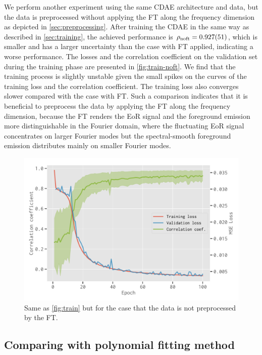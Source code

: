 \documentclass[letters,a4paper,fleqn,usenatbib]{mnras}
\newcommand{\R}[1]{\mathrm{#1}}
\begin{document}
We perform another experiment using the same CDAE architecture and data,
but the data is preprocessed without applying the FT along the
frequency dimension as depicted in \autoref{sec:preprocessing}.
After training the CDAE in the same way as described in
\autoref{sec:training}, the achieved performance is
$\rho_{\R{noft}} = \num{0.927 +- 0.051}$, which is smaller and has a
larger uncertainty than the case with FT applied, indicating a worse
performance.
The losses and the correlation coefficient on the validation set
during the training phase are presented in \autoref{fig:train-noft}.
We find that the training process is slightly unstable given the small
spikes on the curves of the training loss and the correlation
coefficient.
The training loss also converges slower compared with the case with FT.
Such a comparison indicates that it is beneficial to preprocess the
data by applying the FT along the frequency dimension, because the FT
renders the EoR signal and the foreground emission more distinguishable
in the Fourier domain, where the fluctuating EoR signal concentrates on
larger Fourier modes but the spectral-smooth foreground emission
distributes mainly on smaller Fourier modes.

\begin{figure}
  \centering
  \includegraphics[width=\columnwidth]{cdae-train-noft}
  \caption{\label{fig:train-noft}%
    Same as \autoref{fig:train} but for the case that the data is not
    preprocessed by the FT.
  }
\end{figure}


\subsection{Comparing with polynomial fitting method}
\label{sec:polyfit}
\end{document}
